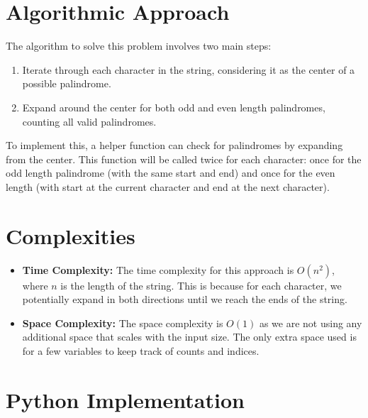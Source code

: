 \section*{Algorithmic Approach}

The algorithm to solve this problem involves two main steps:

\begin{enumerate}
    \item Iterate through each character in the string, considering it as the center of a possible palindrome.
    \item Expand around the center for both odd and even length palindromes, counting all valid palindromes.
\end{enumerate}

To implement this, a helper function can check for palindromes by expanding from the center. This function will be called twice for each character: once for the odd length palindrome (with the same start and end) and once for the even length (with start at the current character and end at the next character).


\section*{Complexities}

\begin{itemize}
	\item \textbf{Time Complexity:} The time complexity for this approach is \( O(n^2) \), where \( n \) is the length of the string. This is because for each character, we potentially expand in both directions until we reach the ends of the string.
	\item \textbf{Space Complexity:} The space complexity is \( O(1) \) as we are not using any additional space that scales with the input size. The only extra space used is for a few variables to keep track of counts and indices.
\end{itemize}

\newpage %
\section*{Python Implementation}

